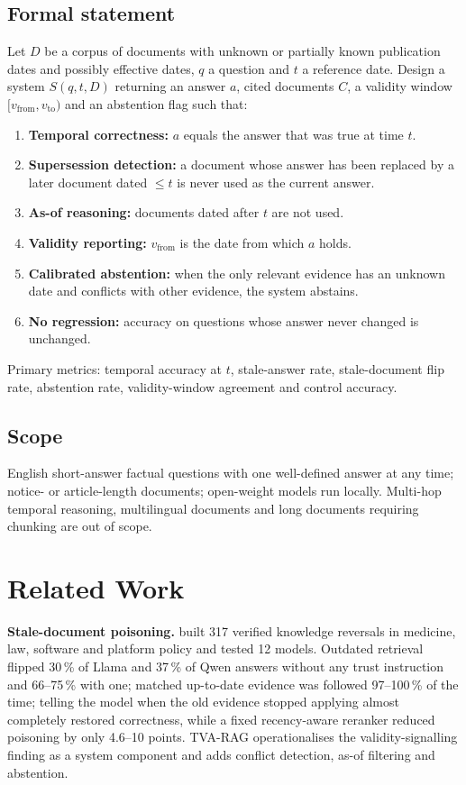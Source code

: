 \documentclass[11pt,a4paper]{report}
\begin{document}
\section{Formal statement}
Let $D$ be a corpus of documents with unknown or partially known publication dates and possibly effective dates, $q$ a question and $t$ a reference date. Design a system $S(q,t,D)$ returning an answer $a$, cited documents $C$, a validity window $[v_{\text{from}}, v_{\text{to}})$ and an abstention flag such that:
\begin{enumerate}[label=(\alph*), leftmargin=2em]
  \item \textbf{Temporal correctness:} $a$ equals the answer that was true at time $t$.
  \item \textbf{Supersession detection:} a document whose answer has been replaced by a later document dated $\le t$ is never used as the current answer.
  \item \textbf{As-of reasoning:} documents dated after $t$ are not used.
  \item \textbf{Validity reporting:} $v_{\text{from}}$ is the date from which $a$ holds.
  \item \textbf{Calibrated abstention:} when the only relevant evidence has an unknown date and conflicts with other evidence, the system abstains.
  \item \textbf{No regression:} accuracy on questions whose answer never changed is unchanged.
\end{enumerate}
Primary metrics: temporal accuracy at $t$, stale-answer rate, stale-document flip rate, abstention rate, validity-window agreement and control accuracy.

\section{Scope}
English short-answer factual questions with one well-defined answer at any time; notice- or article-length documents; open-weight models run locally. Multi-hop temporal reasoning, multilingual documents and long documents requiring chunking are out of scope.

\chapter{Related Work}
\textbf{Stale-document poisoning.} \cite{stale} built 317 verified knowledge reversals in medicine, law, software and platform policy and tested 12 models. Outdated retrieval flipped 30\,\% of Llama and 37\,\% of Qwen answers without any trust instruction and 66--75\,\% with one; matched up-to-date evidence was followed 97--100\,\% of the time; telling the model when the old evidence stopped applying almost completely restored correctness, while a fixed recency-aware reranker reduced poisoning by only 4.6--10 points. TVA-RAG operationalises the validity-signalling finding as a system component and adds conflict detection, as-of filtering and abstention.
\end{document}
